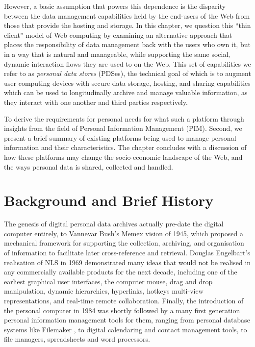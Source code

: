 \documentclass[runningheads,a4paper]{llncs}
\begin{document}
However, a basic assumption that powers this dependence is the disparity between the data management capabilities held by the end-users of the Web from those that provide the hosting and storage. In this chapter, we question this ``thin client'' model of Web computing by examining an alternative approach that places the responsibility of data management back with the users who own it, but in a way that is natural and manageable, while supporting the same social, dynamic interaction flows they are used to on the Web.  This set of capabilities we refer to as \emph{personal data stores} (PDSes), the technical goal of which is to augment user computing devices with secure data storage, hosting, and sharing capabilities which can be used to longitudinally archive and manage valuable information, as they interact with one another and third parties respectively.  

To derive the requirements for personal needs for what such a platform through insights from the field of Personal Information Management (PIM).  Second, we present a brief summary of existing platforms being used to manage personal information and their characteristics.  The chapter concludes with a discussion of how these platforms may change the socio-economic landscape of the Web, and the ways personal data is shared, collected and handled.

\section{Background and Brief History}

The genesis of digital personal data archives actually pre-date the digital computer entirely, to Vannevar Bush's Memex vision of 1945\cite{memex}, which proposed a mechanical framework for supporting the collection, archiving, and organisation of information to facilitate later cross-reference and retrieval.  Douglas Engelbart's realisation of NLS\cite{engelartnls} in 1969 demonstrated many ideas that would not be realised in any commercially available products for the next decade, including one of the earliest graphical user interfaces, the computer mouse, drag and drop manipulation, dynamic hierarchies, hyperlinks, hotkeys multi-view representations, and real-time remote collaboration.  Finally, the introduction of the personal computer in 1984 was shortly followed by a many first generation personal information management tools for them, ranging from personal database systems like Filemaker \cite{filemaker}, to digital calendaring and contact management tools, to file managers, spreadsheets and word processors.
\end{document}
